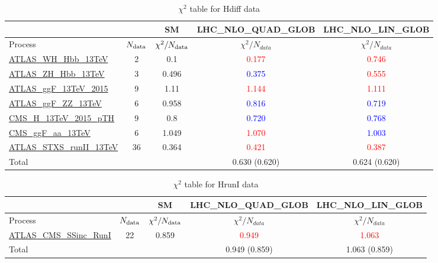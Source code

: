 \documentclass{article}
\begin{document}
\begin{table}[H]
\centering
\begin{tabular}{|l|c|c|c|c|}
\hline
 \multicolumn{2}{|c|}{} & SM& LHC_NLO_QUAD_GLOB& LHC_NLO_LIN_GLOB\\ \hline
Process & $N_{\rm data}$ & $\chi^ 2/N_{\rm data}$& $\chi^ 2/N_{data}$& $\chi^ 2/N_{data}$\\ \hline
\href{https://arxiv.org}{ATLAS_WH_Hbb_13TeV} & 2 & 0.1 & \textcolor{red}                            {0.177} & \textcolor{red}                            {0.746} \\ \hline
\href{https://arxiv.org}{ATLAS_ZH_Hbb_13TeV} & 3 & 0.496 & \textcolor{blue}                            {0.375} & \textcolor{red}                            {0.555} \\ \hline
\href{https://arxiv.org}{ATLAS_ggF_13TeV_2015} & 9 & 1.11 & \textcolor{red}                            {1.144} & \textcolor{red}                            {1.111} \\ \hline
\href{https://arxiv.org}{ATLAS_ggF_ZZ_13TeV} & 6 & 0.958 & \textcolor{blue}                            {0.816} & \textcolor{blue}                            {0.719} \\ \hline
\href{https://arxiv.org}{CMS_H_13TeV_2015_pTH} & 9 & 0.8 & \textcolor{blue}                            {0.720} & \textcolor{blue}                            {0.768} \\ \hline
\href{https://arxiv.org}{CMS_ggF_aa_13TeV} & 6 & 1.049 & \textcolor{red}                            {1.070} & \textcolor{blue}                            {1.003} \\ \hline
\href{https://arxiv.org}{ATLAS_STXS_runII_13TeV} & 36 & 0.364 & \textcolor{red}                            {0.421} & \textcolor{red}                            {0.387} \\ \hline
\hline Total & &  & 0.630 (0.620) & 0.624 (0.620) \\ \hline
\end{tabular}
\caption{$\chi^2$ table for Hdiff data}
\end{table}
\begin{table}[H]
\centering
\begin{tabular}{|l|c|c|c|c|}
\hline
 \multicolumn{2}{|c|}{} & SM& LHC_NLO_QUAD_GLOB& LHC_NLO_LIN_GLOB\\ \hline
Process & $N_{\rm data}$ & $\chi^ 2/N_{\rm data}$& $\chi^ 2/N_{data}$& $\chi^ 2/N_{data}$\\ \hline
\href{https://arxiv.org}{ATLAS_CMS_SSinc_RunI} & 22 & 0.859 & \textcolor{red}                            {0.949} & \textcolor{red}                            {1.063} \\ \hline
\hline Total & &  & 0.949 (0.859) & 1.063 (0.859) \\ \hline
\end{tabular}
\caption{$\chi^2$ table for HrunI data}
\end{table}
\end{document}
